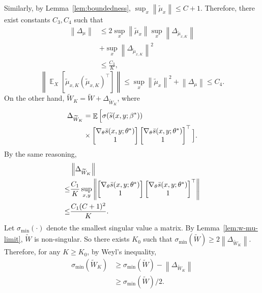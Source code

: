 \documentclass[11pt,a4paper]{article}
\DeclareMathOperator{\E}{\mathbb{E}}
\newcommand{\wt}[1]{\widetilde{#1}}
\newcommand{\gtheta}{\ensuremath \nabla_{\theta}}
\newcommand{\ssf}[3]{\bar{s}(#1, #2; #3)}
\newcommand{\sbc}[3]{\wt{s}(#1, #2; #3)}
\newcommand{\wbk}{\wt{W}_{K}}
\newcommand{\wb}{\wt{W}}
\newcommand{\mubxk}{\wt{\mu}_{x, K}}
\newcommand{\mubx}{\wt{\mu}_{x}}
\newcommand{\vnorm}[1]{\left\| #1 \right\|}
\begin{document}
Similarly, by Lemma~\ref{lem:boundedness}, 
$\sup_x\vnorm{\mubx} \leq C + 1$. Therefore, there exist constants $C_3, C_4$ such that
\begin{equation*}
\begin{aligned}
\vnorm{\Delta_{\mu}} & \leq 2 \sup_x\vnorm{\mubx} \sup_x\vnorm{\Delta_{\mubxk}} \\
& + \sup_x\vnorm{\Delta_{\mubxk}}^2 \\
& \leq \frac{C_3}{K}, 
\end{aligned}
\end{equation*}
\[
\vnorm{\E_X \left[\mubxk (\mubxk)^\top\right]} \leq \sup_x\vnorm{\mubx}^2  + \vnorm{\Delta_{\mu}} \leq C_4. 
\]
On the other hand, $ \wbk = \wb + \Delta_{\wbk} 
$, where 
\begin{equation*}
\begin{aligned}
\Delta_{\wbk} & =  \E \Big[\sigma(\sbc{x}{y}{\beta^*})  \\
& \times \begin{bmatrix} \gtheta \ssf{x}{y}{\theta^*} \\ 1\end{bmatrix} \begin{bmatrix} \gtheta \ssf{x}{y}{\theta^*} \\ 1\end{bmatrix}^\top\Big].
\end{aligned}
\end{equation*}
By the same reasoning,
\begin{equation*}
\begin{aligned}
 & \vnorm{ \Delta_{\wbk} } \\
 \leq & \frac{C_1}{K}\sup_{x,y} \vnorm{\begin{bmatrix} \gtheta \ssf{x}{y}{\theta^*} \\ 1\end{bmatrix}\begin{bmatrix} \gtheta \ssf{x}{y}{\theta^*} \\ 1\end{bmatrix}^\top} \\
 \leq & \frac{C_1(C+1)^2}{K}.
\end{aligned}
\end{equation*}
Let $\sigma_{\min}(\cdot)$ denote the smallest singular value a matrix. By Lemma~\ref{lem:w-mu-limit}, $\wb$ is non-singular. 
So there exists $K_0$ such that $\sigma_{\min}\left(\wb\right) \geq 2 \vnorm{ \Delta_{\wbk} }$. Therefore, for any $K\geq K_0$, by Weyl's inequality, 
\begin{equation*}
\begin{aligned}
\sigma_{\min}\left(\wbk\right) &\geq \sigma_{\min}\left(\wb\right) -  \vnorm{ \Delta_{\wbk} } \\
& \geq \sigma_{\min}\left(\wb\right) / 2.  
\end{aligned}
\end{equation*}
\end{document}
